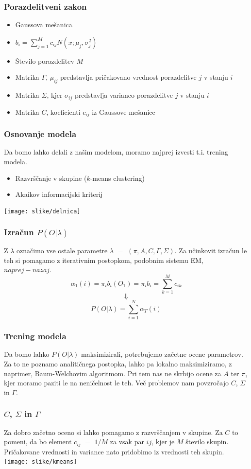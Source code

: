 \documentclass{beamer} %
\begin{document}
\begin{frame}
\frametitle{Porazdelitveni zakon}
\begin{itemize}
	\item Gaussova mešanica
	\item  $b_{i} = \sum_{j = 1}^{M}{c_{ij}} N(x;\mu_{j}, \sigma_{j}^2)$
	\item Število porazdelitev $M$
	\item Matrika $\Gamma$, $\mu_{ij}$ predstavlja pričakovano vrednost porazdelitve $j$ v stanju $i$
	\item Matrika $\Sigma$, kjer $\sigma_{ij}$ predstavlja varianco porazdelitve $j$ v stanju $i$
	\item Matrika $C$, koeficienti $c_{ij}$ iz Gaussove mešanice
\end{itemize}
\end{frame}

\begin{frame}
\frametitle{Osnovanje modela}
Da bomo lahko delali z našim modelom, moramo najprej izvesti t.i. trening modela.
\begin{itemize}
	\item Razvrščanje v skupine ($k$-means clustering)
	\item Akaikov informacijski kriterij
\end{itemize}
\texttt{[image: slike/delnica]}
\end{frame}

\begin{frame}
\frametitle{Izračun  $P(O|\lambda)$}
Z $\lambda$ označimo vse ostale parametre  $\lambda$ $=$ $(\pi,A,C,\Gamma,\Sigma)$.
Za učinkovit izračun le teh si pomagamo z iterativnim postopkom, podobnim sistemu EM, $naprej - nazaj$.
$$\alpha_{1}(i) = \pi_{i}b_{i}(O_{1}) = \pi_{i}b_{i} = \sum_{k = 1}^{M}{c_{ik}}$$
$$\Downarrow$$
$$P(O|\lambda) = \sum_{i=1}^{N}{\alpha_{T}(i)}$$
\end{frame}

\begin{frame}
\frametitle{Trening modela}
Da bomo lahko $P(O|\lambda)$ maksimizirali, potrebujemo začetne ocene parametrov. 
Za to ne poznamo analitičnega postopka, lahko pa lokalno maksimiziramo, z naprimer, Baum-Welchovim algoritmom.
Pri tem nas ne skrbijo ocene za $A$ ter $\pi$, kjer moramo paziti le na neničelnost le teh.
Več problemov nam povzročajo  $C$, $\Sigma$ in $\Gamma$.
\end{frame}

\begin{frame}
\frametitle{ $C$, $\Sigma$ in $\Gamma$}
 Za dobro začetno oceno si lahko pomagamo z razvrščanjem v skupine.
 Za $C$ to pomeni, da bo element $c_{ij}$ $=$ $1/M$ za vsak par $ij$, kjer je $M$ število skupin. Pričakovane vrednosti in variance nato pridobimo iz vrednosti teh skupin.
 \ \\
 \texttt{[image: slike/kmeans]}
\end{frame}
\end{document}
